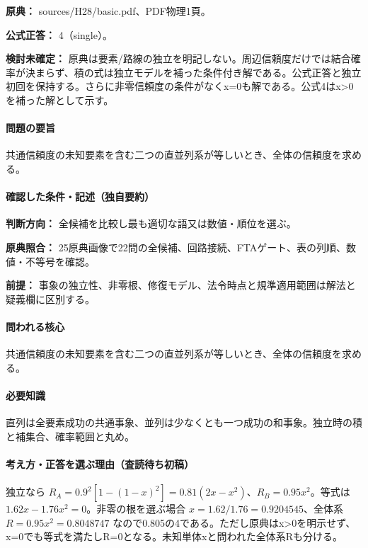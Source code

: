 \noindent\textbf{原典：} sources/H28/basic.pdf、PDF物理1頁。

\textbf{公式正答：} 4（single）。

\par\textbf{検討未確定：} 原典は要素/路線の独立を明記しない。周辺信頼度だけでは結合確率が決まらず、積の式は独立モデルを補った条件付き解である。公式正答と独立初回を保持する。さらに非零信頼度の条件がなくx=\allowbreak{}0も解である。公式4はx>0を補った解として示す。

\paragraph{問題の要旨} 共通信頼度の未知要素を含む二つの直並列系が等しいとき、全体の信頼度を求める。

\paragraph{確認した条件・記述（独自要約）}\mbox{}\par

\noindent\textbf{判断方向：} 全候補を比較し最も適切な語又は数値・順位を選ぶ。\par

\noindent\textbf{原典照合：} 25原典画像で22問の全候補、回路接続、FTAゲート、表の列順、数値・不等号を確認。\par

\noindent\textbf{前提：} 事象の独立性、非零根、修復モデル、法令時点と規準適用範囲は解法と疑義欄に区別する。\par

\paragraph{問われる核心} 共通信頼度の未知要素を含む二つの直並列系が等しいとき、全体の信頼度を求める。

\paragraph{必要知識} 直列は全要素成功の共通事象、並列は少なくとも一つ成功の和事象。独立時の積と補集合、確率範囲と丸め。

\paragraph{考え方・正答を選ぶ理由（査読待ち初稿）} 独立なら \(R_A=0.9^2[1-(1-x)^2]=0.81(2x-x^2)\)、\(R_B=0.95x^2\)。等式は \(1.62x-1.76x^2=0\)。非零の根を選ぶ場合 \(x=1.62/1.76=0.9204545\)、全体系 \(R=0.95x^2=0.8048747\) なので0.805の4である。ただし原典はx>0を明示せず、x=\allowbreak{}0でも等式を満たしR=\allowbreak{}0となる。未知単体xと問われた全体系Rも分ける。

